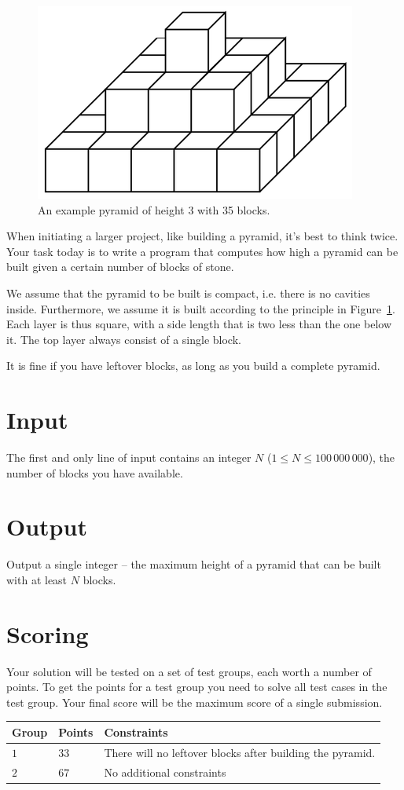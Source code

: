 
\begin{figure}
\centering
\includegraphics{pyramid.png}
\caption{An example pyramid of height 3 with 35 blocks.}
\label{fig:pyramid}
\end{figure}

When initiating a larger project, like building a pyramid, it's best to think twice.
Your task today is to write a program that computes how high a pyramid can be built given a certain number of blocks of stone.

We assume that the pyramid to be built is compact, i.e. there is no cavities inside.
Furthermore, we assume it is built according to the principle in Figure~\ref{fig:pyramid}.
Each layer is thus square, with a side length that is two less than the one below it.
The top layer always consist of a single block.

It is fine if you have leftover blocks, as long as you build a complete pyramid.

\section*{Input}
The first and only line of input contains an integer $N$ ($1 \le N \le 100\,000\,000$), the number of blocks you have available.

\section*{Output}
Output a single integer -- the maximum height of a pyramid that can be built with at least $N$ blocks.

\section*{Scoring}
Your solution will be tested on a set of test groups, each worth a number of points.
To get the points for a test group you need to solve all test cases in the test group. Your final score will be the maximum score of a single submission.

\noindent
\begin{tabular}{| l | l | l |}
  \hline
  Group & Points & Constraints \\ \hline
  $1$    & $33$        &  There will no leftover blocks after building the pyramid. \\ \hline
  $2$    & $67$        &  No additional constraints \\ \hline
\end{tabular}

